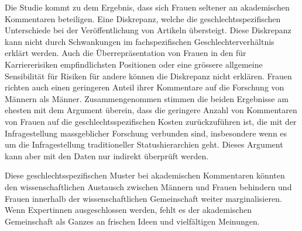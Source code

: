 Die Studie kommt zu dem Ergebnis, dass sich Frauen seltener an akademischen Kommentaren beteiligen.
Eine Diskrepanz, welche die geschlechtsspezifischen Unterschiede bei der Veröffentlichung von Artikeln übersteigt. 
Diese Diskrepanz kann nicht durch Schwankungen im fachspezifischen Geschlechterverhältnis erklärt werden. 
Auch die Überrepräsentation von Frauen in den für Karriererisiken empfindlichsten Positionen oder 
eine grössere allgemeine Sensibilität für Risiken für andere können die Diskrepanz nicht erklären. 
Frauen richten auch einen geringeren Anteil ihrer Kommentare auf die Forschung von Männern als Männer. 
Zusammengenommen stimmen die beiden Ergebnisse am ehesten mit dem Argument überein, 
dass die geringere Anzahl von Kommentaren von Frauen auf die geschlechtsspezifischen Kosten zurückzuführen ist, 
die mit der Infragestellung massgeblicher Forschung verbunden sind, 
insbesondere wenn es um die Infragestellung traditioneller Statushierarchien geht. 
Dieses Argument kann aber mit den Daten nur indirekt überprüft werden.
 
Diese geschlechtsspezifischen Muster bei akademischen Kommentaren könnten den wissenschaftlichen Austausch 
zwischen Männern und Frauen behindern und Frauen innerhalb der wissenschaftlichen Gemeinschaft weiter marginalisieren. 
Wenn Expertinnen ausgeschlossen werden, fehlt es der akademischen Gemeinschaft als Ganzes an frischen Ideen und vielfältigen Meinungen.